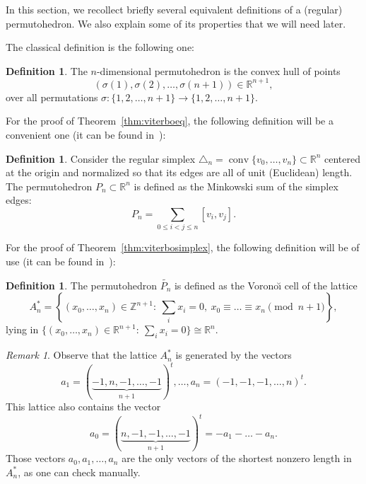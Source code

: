 \documentclass[12pt,a4paper,oneside]{amsart}
\theoremstyle{definition}
\newtheorem{definition}[theorem]{Definition}
\theoremstyle{remark}
\newtheorem{remark}[theorem]{Remark}
\numberwithin{equation}{section}
\DeclareMathOperator{\conv}{conv}
\begin{document}
In this section, we recollect briefly several equivalent definitions of a (regular) permutohedron. We also explain some of its properties that we will need later.

The classical definition is the following one:

\begin{definition}
\label{def:permut1}
The $n$-dimensional permutohedron is the convex hull of points
$$
(\sigma(1), \sigma(2), \ldots, \sigma(n+1)) \in \mathbb{R}^{n+1},
$$
over all permutations $\sigma : \{1,2,\ldots,n+1\} \to \{1,2,\ldots,n+1\}$.
\end{definition}

For the proof of Theorem~\ref{thm:viterboeq}, the following definition will be a convenient one (it can be found in~\cite[Lecture~7.3]{ziegler1995lectures}):

\begin{definition}
\label{def:permut2}
Consider the regular simplex $\triangle_n = \conv\{v_0, \ldots, v_n\} \subset \mathbb{R}^n$ centered at the origin and normalized so that its edges are all of unit (Euclidean) length. The permutohedron $P_n \subset \mathbb{R}^n$ is defined as the Minkowski sum of the simplex edges:
$$
P_n = \sum_{0\le i<j \le n} [v_i,v_j].
$$
\end{definition}

For the proof of Theorem~\ref{thm:viterbosimplex}, the following definition will be of use (it can be found in~\cite[Chapter~21]{conway2013sphere}):

\begin{definition}
\label{def:permut3}
The permutohedron $\widetilde{P_n}$ is defined as the Vorono\u{\i} cell of the lattice
$$
A_n^* = \left\{(x_0, \ldots, x_n) \in \mathbb{Z}^{n+1}: \ \sum\limits_{i} x_i = 0, \ x_0 \equiv \ldots \equiv x_n \pmod{n+1}\right\},
$$
lying in $\{(x_0, \ldots, x_n) \in \mathbb{R}^{n+1}: \ \sum\limits_{i} x_i = 0\} \cong \mathbb{R}^n$.
\end{definition}

\begin{remark}
\label{rem:lattice} Observe that the lattice $A_n^*$ is generated by the vectors
$$
a_1 = (\underbrace{-1, n, -1, \ldots, -1}_{n+1})^t, \ldots, a_{n} = (-1,-1,-1,\ldots, n)^t.
$$
This lattice also contains the vector
$$
a_0 = (\underbrace{n, -1, -1, \ldots, -1}_{n+1})^t = -a_1 - \ldots -a_n.
$$
Those vectors $a_0, a_1, \ldots, a_n$ are the only vectors of the shortest nonzero length in $A_n^*$, as one can check manually.
\end{remark}
\end{document}
